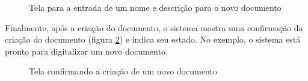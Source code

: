 \begin{figure}[h]
 \centering
    \setlength\fboxsep{0pt}
    \setlength\fboxrule{0.5pt}
  \caption {Tela para a entrada de um nome e descrição para o novo documento}
  \label{fig:dig_6}
\end{figure}

Finalmente, após a criação do documento, o sistema mostra uma confirmação da criação do documento (figura \ref{fig:dig_7}) e indica seu estado. No exemplo, o sistema está pronto para digitalizar um novo documento.

\begin{figure}[h]
 \centering
    \setlength\fboxsep{0pt}
    \setlength\fboxrule{0.5pt}
  \caption {Tela confirmando a criação de um novo documento}
  \label{fig:dig_7}
\end{figure}

